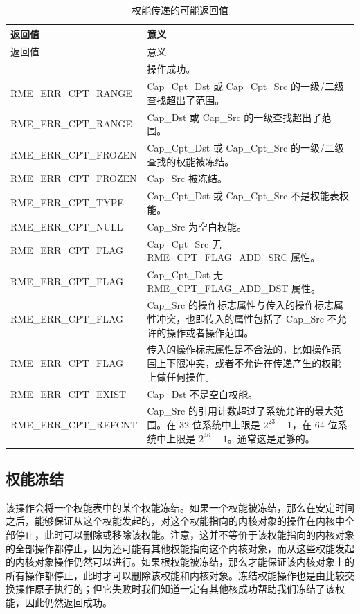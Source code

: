 \begin{xltabular}{\textwidth}{@{}>{\hsize\raggedright\arraybackslash}X>{\hsize\raggedright\arraybackslash}X@{}}
\caption{权能传递的可能返回值}\label{tab:2-10-capability-transfer-return-values}\\
\toprule
返回值 & 意义\tabularnewline
\endfirsthead
\toprule
返回值 & 意义\tabularnewline
\midrule
\endhead
\bottomrule
{} & 操作成功。\tabularnewline
    RME\_ERR\_CPT\_RANGE & Cap\_Cpt\_Dst 或 Cap\_Cpt\_Src 的一级/二级查找超出了范围。\tabularnewline
    RME\_ERR\_CPT\_RANGE & Cap\_Dst 或 Cap\_Src 的一级查找超出了范围。\tabularnewline
    RME\_ERR\_CPT\_FROZEN & Cap\_Cpt\_Dst 或 Cap\_Cpt\_Src 的一级/二级查找的权能被冻结。\tabularnewline
    RME\_ERR\_CPT\_FROZEN & Cap\_Src 被冻结。\tabularnewline
    RME\_ERR\_CPT\_TYPE & Cap\_Cpt\_Dst 或 Cap\_Cpt\_Src 不是权能表权能。\tabularnewline
    RME\_ERR\_CPT\_NULL & Cap\_Src 为空白权能。\tabularnewline
    RME\_ERR\_CPT\_FLAG & Cap\_Cpt\_Src 无 RME\_CPT\_FLAG\_ADD\_SRC 属性。\tabularnewline
    RME\_ERR\_CPT\_FLAG & Cap\_Cpt\_Dst 无 RME\_CPT\_FLAG\_ADD\_DST 属性。\tabularnewline
    RME\_ERR\_CPT\_FLAG & Cap\_Src 的操作标志属性与传入的操作标志属性冲突，也即传入的属性包括了 Cap\_Src 不允许的操作或者操作范围。\tabularnewline
    RME\_ERR\_CPT\_FLAG & 传入的操作标志属性是不合法的，比如操作范围上下限冲突，或者不允许在传递产生的权能上做任何操作。\tabularnewline
    RME\_ERR\_CPT\_EXIST & Cap\_Dst 不是空白权能。\tabularnewline
    RME\_ERR\_CPT\_REFCNT & Cap\_Src 的引用计数超过了系统允许的最大范围。在 32 位系统中上限是 $2^{23}-1$，在 64 位系统中上限是 $2^{46}-1$。通常这是足够的。\tabularnewline
\end{xltabular}

\subsection{权能冻结}\label{subsec:2-freeze-a-capability}
\nopagebreak[4]

该操作会将一个权能表中的某个权能冻结。如果一个权能被冻结，那么在安定时间之后，能够保证从这个权能发起的，对这个权能指向的内核对象的操作在内核中全部停止，此时可以删除或移除该权能。注意，这并不等价于该权能指向的内核对象的全部操作都停止，因为还可能有其他权能指向这个内核对象，而从这些权能发起的内核对象操作仍然可以进行。如果根权能被冻结，那么才能保证该内核对象上的所有操作都停止，此时才可以删除该权能和内核对象。冻结权能操作也是由比较交换操作原子执行的；但它失败时我们知道一定有其他核成功帮助我们冻结了该权能，因此仍然返回成功。

